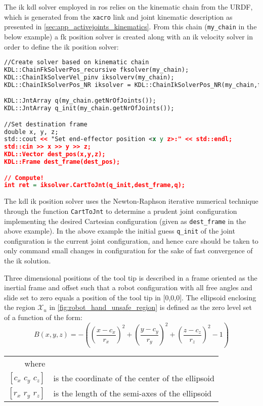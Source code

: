 The \gls{ik} \gls{kdl} solver employed in \gls{ros} relies on the kinematic chain from the URDF, which is generated from the \texttt{xacro} link and joint kinematic description as presented in %
\autoref{sec:app_activejoints_kinematics}. From this chain (\texttt{my\_chain} in the below example) a \gls{fk} position solver is created along with an \gls{ik} velocity solver in order to define the \gls{ik} position solver:

\begin{lstlisting}[language=xml]
//Create solver based on kinematic chain
KDL::ChainFkSolverPos_recursive fksolver(my_chain);
KDL::ChainIkSolverVel_pinv iksolverv(my_chain);
KDL::ChainIkSolverPos_NR iksolver = KDL::ChainIkSolverPos_NR(my_chain,fksolver,iksolverv,100,1e-6);

KDL::JntArray q(my_chain.getNrOfJoints());
KDL::JntArray q_init(my_chain.getNrOfJoints());

//Set destination frame
double x, y, z;
std::cout << "Set end-effector position <x y z>:" << std::endl;
std::cin >> x >> y >> z;
KDL::Vector dest_pos(x,y,z);
KDL::Frame dest_frame(dest_pos);

// Compute!
int ret = iksolver.CartToJnt(q_init,dest_frame,q);
\end{lstlisting}

The \gls{kdl} \gls{ik} position solver uses the Newton-Raphson iterative numerical technique through the function \texttt{CartToJnt} to determine a prudent joint configuration implementing the desired Cartesian configuration (given as \texttt{dest\_frame} in the above example). In the above example the initial guess \texttt{q\_init} of the joint configuration is the current joint configuration, and hence care should be taken to only command small changes in configuration for the sake of fast convergence of the \gls{ik} solution.


Three dimensional positions of the tool tip is described in a frame oriented as the inertial frame and offset such that a robot configuration with all free angles and slide set to zero equals a position of the tool tip in [0,0,0].
The ellipsoid enclosing the region $\mathcal{X}_u$ in \autoref{fig:robot_hand_unsafe_region} is defined as the zero level set of a function of the form:
\begin{equation}
B(x,y,z) = -\left(  \left(\frac{x-c_x}{r_x}\right)^2 + \left(\frac{y-c_y}{r_y}\right)^2 + \left(\frac{z-c_z}{r_z}\right)^2 - 1 \right)
\end{equation}
\begin{tabular}{rl}
where&\\
$[c_x\,\, c_y\,\, c_z]$ & is the coordinate of the center of the ellipsoid\\
$[r_x\,\, r_y\,\, r_z]$ & is the length of the semi-axes of the ellipsoid\\
\end{tabular}


